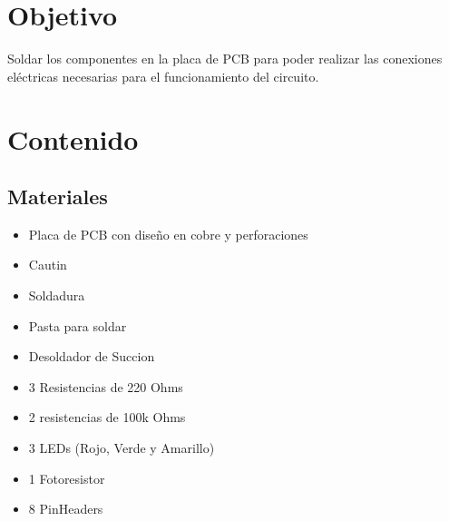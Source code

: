 \documentclass[12pt]{report}
\begin{document}
\chapter*{Objetivo}
Soldar los componentes en la placa de PCB para poder realizar las conexiones eléctricas necesarias para el funcionamiento del circuito.
\newpage

\chapter{Contenido}
\section{Materiales}
\begin{itemize}
    \item Placa de PCB con diseño en cobre y perforaciones
    \item Cautin
    \item Soldadura
    \item Pasta para soldar
    \item Desoldador de Succion
    \item 3 Resistencias de 220 Ohms
    \item 2 resistencias de 100k Ohms
    \item 3 LEDs (Rojo, Verde y Amarillo)
    \item 1 Fotoresistor
    \item 8 PinHeaders
\end{itemize}
\end{document}
